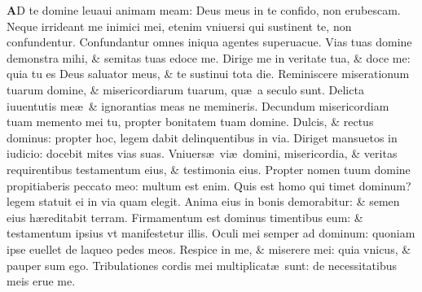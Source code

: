 \documentclass[a5paper,10pt]{book}
\def\ae{æ}
\begin{document}
\begin{multicols*}{2}
\vspace{-.5em}
\lettrine[lines=2]{\bfseries \color{red} A}{}D te domine leuaui animam meam: Deus meus in te confido, non erubescam.
\newline \color{red} N\color{black}eque irrideant me inimici mei, etenim vniuersi qui sustinent te, non confundentur.
\newline \color{red} C\color{black}onfundantur omnes iniqua agentes superuacue.
\newline \color{red} V\color{black}ias tuas domine demonstra mihi, \& semitas tuas edoce me.
\newline \color{red} D\color{black}irige me in veritate tua, \& doce me: quia tu es Deus saluator meus, \& te sustinui tota die.
\newline \color{red} R\color{black}eminiscere miserationum tuarum domine, \& misericordiarum tuarum, qu\ae \ a seculo sunt.
\newline \color{red} D\color{black}elicta iuuentutis me\ae \ \& ignorantias meas ne memineris.
\newline \color{red} D\color{black}ecundum misericordiam tuam memento mei tu, propter bonitatem tuam domine.
\newline \color{red} D\color{black}ulcis, \& rectus dominus: propter hoc, legem dabit delinquentibus in via.
\newline \color{red} D\color{black}iriget mansuetos in iudicio: docebit mites vias suas.
\newline \color{red} V\color{black}niuers\ae \ vi\ae \ domini, misericordia, \& veritas requirentibus testamentum eius, \& testimonia eius.
\newline \color{red} P\color{black}ropter nomen tuum domine propitiaberis peccato meo: multum est enim.
\newline \color{red} Q\color{black}uis est homo qui timet dominum? legem statuit ei in via quam elegit.
\newline \color{red} A\color{black}nima eius in bonis demorabitur: \& semen eius h\ae reditabit terram.
\newline \color{red} F\color{black}irmamentum est dominus timentibus eum: \& testamentum ipsius vt manifestetur illis.
\newline \color{red} O\color{black}culi mei semper ad dominum: quoniam ipse euellet de laqueo pedes meos.
\newline \color{red} R\color{black}espice in me, \& miserere mei: quia vnicus, \& pauper sum ego.
\newline \color{red} T\color{black}ribulationes cordis mei multiplicat\ae \ sunt: de necessitatibus meis erue me.

\end{multicols*}
\end{document}

